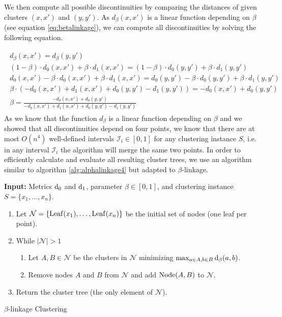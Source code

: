 We then compute all possible discontinuities by comparing the distances of given clusters $(x, x')$ and $(y, y')$. As $d_\beta(x,x')$ is a linear function depending on $\beta$ (see equation \ref{eq:betalinkage}), we can compute all discontinuities by solving the following equation.

\begin{equation*}
    \begin{aligned}
      \begin{gathered}
        d_\beta(x,x') = d_\beta(y,y')\\
        (1 - \beta) \cdot d_0(x,x') + \beta \cdot d_1(x,x') = (1 - \beta) \cdot d_0(y,y') + \beta \cdot d_1(y,y')\\
        d_0(x,x') - \beta \cdot d_0(x,x') + \beta \cdot d_1(x,x') = d_0(y,y') - \beta \cdot d_0(y,y') + \beta \cdot d_1(y,y')\\
        \beta \cdot (- d_0(x,x') + d_1(x,x') + d_0(y,y') - d_1(y,y')) = - d_0(x,x') + d_0(y,y')\\
        \beta = \frac{- d_0(x,x') + d_0(y,y')}{- d_0(x,x') + d_1(x,x') + d_0(y,y') - d_1(y,y')}
        \label{eq:discont}
      \end{gathered}
    \end{aligned}
\end{equation*}
As we know that the function $d_\beta$ is a linear function depending on $\beta$ and we showed that all discontinuities depend on four points, we know that there are at most $O(n^4)$ well-defined intervals $\mathcal{I}_i \in [0,1]$ for any clustering instance $S$, i.e. in any interval $\mathcal{I}_i$ the algorithm will merge the same two points. In order to efficiently calculate and evaluate all resulting cluster trees, we use an algorithm similar to algorithm \ref{alg:alphalinkage4} but adapted to $\beta$-linkage.

\begin{algorithm}
\textbf{Input:} Metrics $\operatorname{d_{0}}$ and $\operatorname{d_{1}}$, parameter $\beta \in [0,1]$, and clustering instance $S = \{x_1, \dots, x_n\}$.
\begin{enumerate}[nosep, leftmargin=*]
\item Let $\mathcal{N} = \{\operatorname{Leaf}(x_1), \dots, \operatorname{Leaf}(x_n)\}$ be the initial set of nodes (one leaf per point).
\item While $|\mathcal{N}| > 1$
\begin{enumerate}[nosep, leftmargin=*]
  \item Let $A, B \in \mathcal{N}$ be the clusters in $\mathcal{N}$ minimizing $\max_{a \in A, b \in B} \operatorname{d_{\beta}}(a, b)$.
  \item Remove nodes $A$ and $B$ from $\mathcal{N}$ and add $\operatorname{Node}(A,B)$ to $\mathcal{N}$.
\end{enumerate}
\item Return the cluster tree (the only element of $\mathcal{N}$).
\end{enumerate}
\caption{$\beta$-linkage Clustering}
\label{alg:betalinkage}
\end{algorithm}


